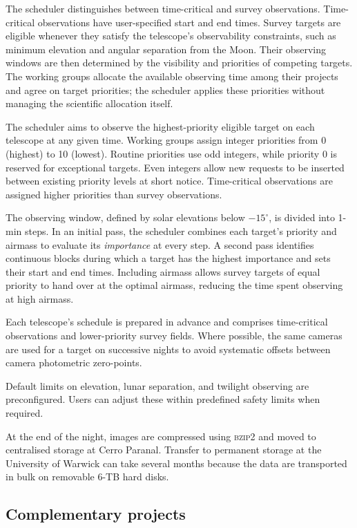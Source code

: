 \documentclass[fleqn,usenatbib]{mnras}
\begin{document}
The scheduler distinguishes between time-critical and survey observations. Time-critical observations have user-specified start and end times. Survey targets are eligible whenever they satisfy the telescope's observability constraints, such as minimum elevation and angular separation from the Moon. Their observing windows are then determined by the visibility and priorities of competing targets. The working groups allocate the available observing time among their projects and agree on target priorities; the scheduler applies these priorities without managing the scientific allocation itself.

The scheduler aims to observe the highest-priority eligible target on each telescope at any given time. Working groups assign integer priorities from 0 (highest) to 10 (lowest). Routine priorities use odd integers, while priority 0 is reserved for exceptional targets. Even integers allow new requests to be inserted between existing priority levels at short notice. Time-critical observations are assigned higher priorities than survey observations.

The observing window, defined by solar elevations below $-15^{\circ}$, is divided into 1-min steps. In an initial pass, the scheduler combines each target's priority and airmass to evaluate its \emph{importance} at every step. A second pass identifies continuous blocks during which a target has the highest importance and sets their start and end times. Including airmass allows survey targets of equal priority to hand over at the optimal airmass, reducing the time spent observing at high airmass.

Each telescope's schedule is prepared in advance and comprises time-critical observations and lower-priority survey fields. Where possible, the same cameras are used for a target on successive nights to avoid systematic offsets between camera photometric zero-points.

Default limits on elevation, lunar separation, and twilight observing are preconfigured. Users can adjust these within predefined safety limits when required.

At the end of the night, images are compressed using \textsc{bzip2} \citep{seward_bzip2} and moved to centralised storage at Cerro Paranal. Transfer to permanent storage at the University of Warwick can take several months because the data are transported in bulk on removable 6-TB hard disks.

\subsection{Complementary projects}\label{sec:related}
\end{document}
